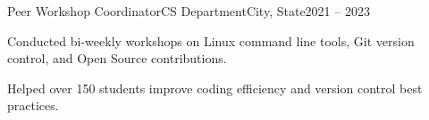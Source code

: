 \begin{cventry}{Peer Workshop Coordinator}{CS Department}{City, State}{2021 -- 2023}
    \item Conducted bi-weekly workshops on Linux command line tools, Git version control, and Open Source contributions.
    \item Helped over 150 students improve coding efficiency and version control best practices.
\end{cventry}

